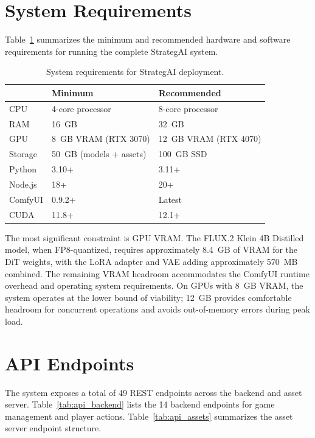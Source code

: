 \documentclass[conference]{IEEEtran}
\begin{document}
\appendix

\section{System Requirements}
\label{app:requirements}

Table~\ref{tab:requirements} summarizes the minimum and recommended hardware and software requirements for running the complete StrategAI system.

\begin{table}[h]
\centering
\caption{System requirements for StrategAI deployment.}
\label{tab:requirements}
\begin{tabular}{@{}p{2.2cm}p{3.5cm}p{3.5cm}@{}}
\toprule
& \textbf{Minimum} & \textbf{Recommended} \\
\midrule
CPU & 4-core processor & 8-core processor \\
RAM & 16~GB & 32~GB \\
GPU & 8~GB VRAM (RTX 3070) & 12~GB VRAM (RTX 4070) \\
Storage & 50~GB (models + assets) & 100~GB SSD \\
\midrule
Python & 3.10+ & 3.11+ \\
Node.js & 18+ & 20+ \\
ComfyUI & 0.9.2+ & Latest \\
CUDA & 11.8+ & 12.1+ \\
\bottomrule
\end{tabular}
\end{table}

The most significant constraint is GPU VRAM. The FLUX.2 Klein 4B Distilled model, when FP8-quantized, requires approximately 8.4~GB of VRAM for the DiT weights, with the LoRA adapter and VAE adding approximately 570~MB combined. The remaining VRAM headroom accommodates the ComfyUI runtime overhead and operating system requirements. On GPUs with 8~GB VRAM, the system operates at the lower bound of viability; 12~GB provides comfortable headroom for concurrent operations and avoids out-of-memory errors during peak load.

\section{API Endpoints}
\label{app:api}

The system exposes a total of 49 REST endpoints across the backend and asset server. Table~\ref{tab:api_backend} lists the 14 backend endpoints for game management and player actions. Table~\ref{tab:api_assets} summarizes the asset server endpoint structure.
\end{document}

